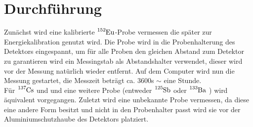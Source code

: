\section{Durchführung}
\label{sec:Durchführung}
Zunächst wird eine kalibrierte $\ce{^{152}Eu}$-Probe vermessen die später zur Energiekalibration
genutzt wird. Die Probe wird in die Probenhalterung des Detektors eingespannt, um für alle
Proben den gleichen Abstand zum Detektor zu garantieren wird ein Messingstab als Abstandshalter
verwendet, dieser wird vor der Messung natürlich wieder entfernt.
Auf dem Computer wird nun die Messung gestartet, die Messzeit beträgt ca. 3600\;s $\sim$ eine Stunde.\\
Für $\ce{^{137}Cs}$ und und eine weitere Probe (entweder $\ce{^{125}Sb}$ oder $\ce{^{133}Ba}$ )
wird äquivalent vorgegangen. Zuletzt wird eine unbekannte Probe vermessen, da diese eine andere
Form besitzt und nicht in den Probenhalter passt wird sie vor der Aluminiumschutzhaube des Detektors
platziert.
